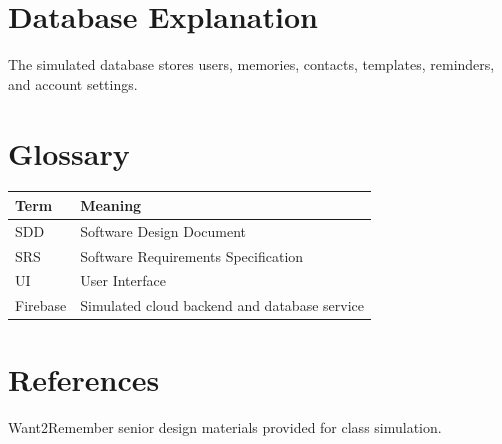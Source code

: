 \documentclass{article}
\begin{document}
\section{Database Explanation}
The simulated database stores users, memories, contacts, templates, reminders, and account settings.

\section{Glossary}
\begin{longtable}{|p{3cm}|p{10cm}|}
\hline
Term & Meaning \\ \hline
SDD & Software Design Document \\ \hline
SRS & Software Requirements Specification \\ \hline
UI & User Interface \\ \hline
Firebase & Simulated cloud backend and database service \\ \hline
\end{longtable}

\section{References}
Want2Remember senior design materials provided for class simulation.
\end{document}
